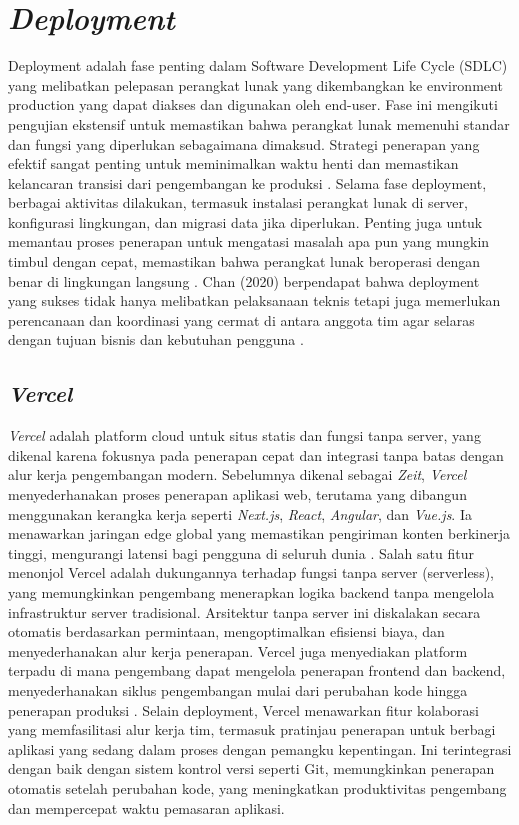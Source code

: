 \section{\textit{Deployment}}

Deployment adalah fase penting dalam Software Development Life Cycle (SDLC) yang melibatkan pelepasan perangkat lunak yang dikembangkan ke environment production yang dapat diakses dan digunakan oleh end-user. Fase ini mengikuti pengujian ekstensif untuk memastikan bahwa perangkat lunak memenuhi standar dan fungsi yang diperlukan sebagaimana dimaksud. Strategi penerapan yang efektif sangat penting untuk meminimalkan waktu henti dan memastikan kelancaran transisi dari pengembangan ke produksi \citep{chan2020devops}.
\singlespacing{}
Selama fase deployment, berbagai aktivitas dilakukan, termasuk instalasi perangkat lunak di server, konfigurasi lingkungan, dan migrasi data jika diperlukan. Penting juga untuk memantau proses penerapan untuk mengatasi masalah apa pun yang mungkin timbul dengan cepat, memastikan bahwa perangkat lunak beroperasi dengan benar di lingkungan langsung \citep{chan2020devops}. Chan (2020) berpendapat bahwa deployment yang sukses tidak hanya melibatkan pelaksanaan teknis tetapi juga memerlukan perencanaan dan koordinasi yang cermat di antara anggota tim agar selaras dengan tujuan bisnis dan kebutuhan pengguna \citep{chan2020devops}.

\subsection{\textit{Vercel}}
\textit{Vercel} adalah platform cloud untuk situs statis dan fungsi tanpa server, yang dikenal karena fokusnya pada penerapan cepat dan integrasi tanpa batas dengan alur kerja pengembangan modern. Sebelumnya dikenal sebagai \emph{Zeit}, \emph{Vercel} menyederhanakan proses penerapan aplikasi web, terutama yang dibangun menggunakan kerangka kerja seperti \emph{Next.js}, \emph{React}, \emph{Angular}, dan \emph{Vue.js}. Ia menawarkan jaringan edge global yang memastikan pengiriman konten berkinerja tinggi, mengurangi latensi bagi pengguna di seluruh dunia \citep{vercel2025platform}.
\singlespacing{}
Salah satu fitur menonjol Vercel adalah dukungannya terhadap fungsi tanpa server (serverless), yang memungkinkan pengembang menerapkan logika backend tanpa mengelola infrastruktur server tradisional. Arsitektur tanpa server ini diskalakan secara otomatis berdasarkan permintaan, mengoptimalkan efisiensi biaya, dan menyederhanakan alur kerja penerapan. Vercel juga menyediakan platform terpadu di mana pengembang dapat mengelola penerapan frontend dan backend, menyederhanakan siklus pengembangan mulai dari perubahan kode hingga penerapan produksi \citep{vercel2025platform}.
\singlespacing{}
Selain deployment, Vercel menawarkan fitur kolaborasi yang memfasilitasi alur kerja tim, termasuk pratinjau penerapan untuk berbagi aplikasi yang sedang dalam proses dengan pemangku kepentingan. Ini terintegrasi dengan baik dengan sistem kontrol versi seperti Git, memungkinkan penerapan otomatis setelah perubahan kode, yang meningkatkan produktivitas pengembang dan mempercepat waktu pemasaran aplikasi.\@ \citep{vercel2025platform}